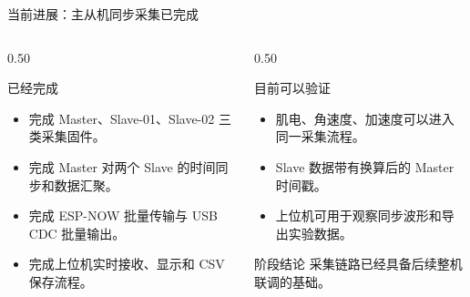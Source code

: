 \documentclass[aspectratio=169,fontset=none]{ctexbeamer}
\begin{document}
\begin{frame}{当前进展：主从机同步采集已完成}
  \begin{columns}
    \begin{column}{0.50\textwidth}
      \begin{block}{已经完成}
        \begin{itemize}
          \item 完成 Master、Slave-01、Slave-02 三类采集固件。
          \item 完成 Master 对两个 Slave 的时间同步和数据汇聚。
          \item 完成 ESP-NOW 批量传输与 USB CDC 批量输出。
          \item 完成上位机实时接收、显示和 CSV 保存流程。
        \end{itemize}
      \end{block}
    \end{column}
    \begin{column}{0.50\textwidth}
      \begin{block}{目前可以验证}
        \begin{itemize}
          \item 肌电、角速度、加速度可以进入同一采集流程。
          \item Slave 数据带有换算后的 Master 时间戳。
          \item 上位机可用于观察同步波形和导出实验数据。
        \end{itemize}
      \end{block}
      \begin{block}{阶段结论}
        采集链路已经具备后续整机联调的基础。
      \end{block}
    \end{column}
  \end{columns}
\end{frame}
\end{document}
